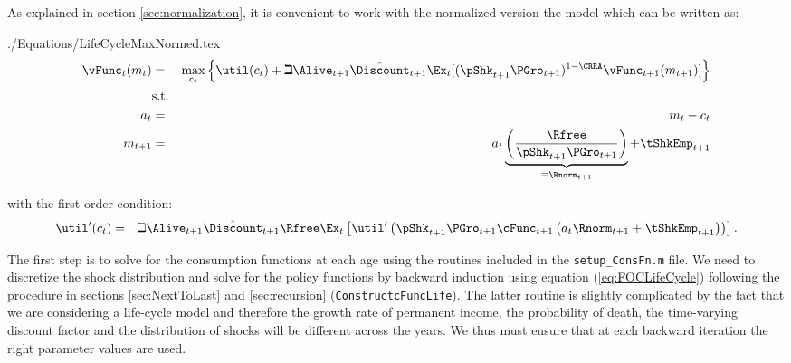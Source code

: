 \documentclass[titlepage]{\econtex}
\begin{document}
As explained in section \ref{sec:normalization}, it is convenient to work with the normalized version the model which can be written as:
\begin{verbatimwrite}{./Equations/LifeCycleMaxNormed.tex}
\begin{eqnarray*}
    {\vFunc}_{t}({m}_{t}) & = & \max_{{c}_{t}} \left\{\util({c}_{t})+\beth\Alive_{t+1}\hat{\Discount}_{t+1}
    \Ex_{t}[(\pShk_{t+1}\PGro_{t+1})^{1-\CRRA}{\vFunc}_{t+1}({m}_{t+1})] \right\}   \\
         & \text{s.t.} &   \nonumber \\
    {a}_{t}   & = & {m}_{t}-{c}_{t} \nonumber
\\      {m}_{t+1} & = & {a}_{t}\underbrace{\left(\frac{\Rfree}{\pShk_{t+1}\PGro_{t+1}}\right)}_{\equiv \Rnorm_{t+1}}+\tShkEmp_{t+1}
\end{eqnarray*}
\end{verbatimwrite}

with the first order condition:
\begin{eqnarray}
\util^{\prime}({c}_{t})&=&\beth\Alive_{t+1}\hat{\Discount}_{t+1}\Rfree \Ex_{t}\left[\util^{\prime}\left(\pShk_{t+1}\PGro_{t+1}\cFunc_{t+1}\left({a}_{t}\Rnorm_{t+1}+\tShkEmp_{t+1}\right)\right)\right]\label{eq:FOCLifeCycle}
.
\end{eqnarray}

The first step is to solve for the consumption functions at each age
using the routines included in the \texttt{setup\_ConsFn.m} file. We
need to discretize the shock distribution and solve for the policy
functions by backward induction using equation (\ref{eq:FOCLifeCycle})
following the procedure in sections \ref{sec:NextToLast} and
\ref{sec:recursion} (\texttt{ConstructcFuncLife}). The latter routine
is slightly complicated by the fact that we are considering a
life-cycle model and therefore the growth rate of permanent income,
the probability of death, the time-varying discount factor and the
distribution of shocks will be different across the years. We thus
must ensure that at each backward iteration the right parameter
values are used.
\end{document}
